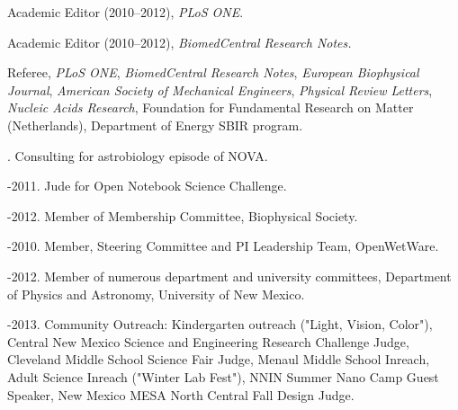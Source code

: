 \documentclass[11pt]{article}
\begin{document}
\bigskip

\medskip

\medskip

\ind Academic Editor (2010–2012), \emph{PLoS ONE}.

\ind Academic Editor (2010–2012), \emph{BiomedCentral Research Notes.}

\ind Referee, \emph{PLoS ONE}, \emph{BiomedCentral Research Notes},
\emph{European Biophysical Journal}, \emph{American Society of Mechanical Engineers}, \emph{Physical Review Letters}, \emph{Nucleic Acids Research}, Foundation for Fundamental Research on Matter (Netherlands), Department of Energy SBIR program.

. Consulting for astrobiology episode of NOVA.

-2011. Jude for Open Notebook Science Challenge.

-2012. Member of Membership Committee, Biophysical Society.

-2010. Member, Steering Committee and PI Leadership Team, OpenWetWare. 

-2012. Member of numerous department and university committees, Department of Physics and Astronomy, University of New Mexico.

-2013. Community Outreach: Kindergarten outreach ("Light, Vision, Color"), Central New Mexico Science and Engineering Research Challenge Judge, Cleveland Middle School Science Fair Judge, Menaul Middle School Inreach, Adult Science Inreach ("Winter Lab Fest"), NNIN Summer Nano Camp Guest Speaker, New Mexico MESA North Central Fall Design Judge.
\end{document}
